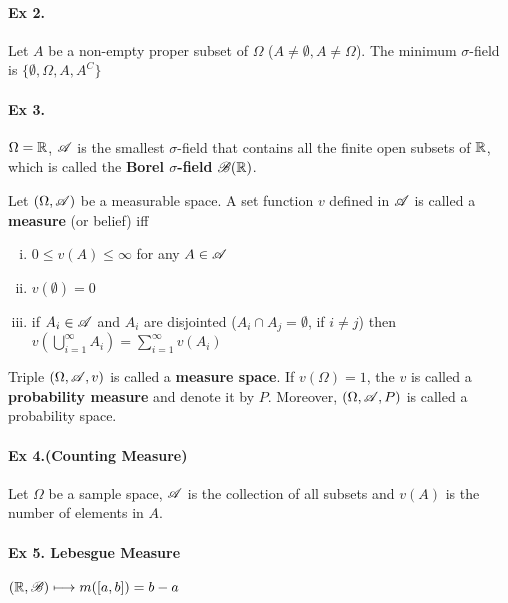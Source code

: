 \paragraph{Ex 2.} Let $A$ be a non-empty proper subset of $\Omega$ ($A\neq \emptyset,A\neq\Omega$). The minimum $\sigma$-field is $\{\emptyset,\Omega, A, A^C\}$

\paragraph{Ex 3.} $\Omega=\mathbb{R}$, $\mathscr{A}$ is the smallest $\sigma$-field that contains all the finite open subsets of $\mathbb{R}$, which is called the \textbf{Borel $\sigma$-field} $\mathscr{B}(\mathbb{R})$.


\begin{definition}
	Let $(\Omega, \mathscr{A})$ be a measurable space. A set function $v$ defined in $\mathscr{A}$ is called a \textbf{measure} (or belief) iff
	\begin{enumerate}[(i)]
		\item $0\leq v(A)\leq \infty$ for any $A\in \mathscr{A}$
		\item $v(\emptyset) = 0$
		\item if $A_i\in \mathscr{A}$ and $A_i$ are disjointed ($A_i\cap A_j=\emptyset$, if $i\neq j$) then $v(\mathop{\bigcup}\limits_{i=1}^{\infty}A_i)=\sum\limits_{i=1}^{\infty}v(A_i)$
	\end{enumerate}
Triple $(\Omega, \mathscr{A},v)$ is called a \textbf{measure space}. If $v(\Omega)=1$, the $v$ is called a \textbf{probability measure} and denote it by $P$. Moreover, $(\Omega, \mathscr{A}, P)$ is called a probability space.
\end{definition}


	\paragraph{Ex 4.(Counting Measure)} Let $\Omega$ be a sample space, $\mathscr{A}$ is the collection of all subsets and $v(A)$ is the number of elements in $A$.
	
	\paragraph{Ex 5. Lebesgue Measure} $(\mathbb{R},\mathscr{B})\longmapsto m(\left[a,b\right])=b-a$
